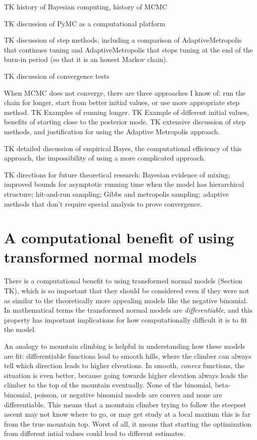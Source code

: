 TK history of Bayesian computing, history of MCMC

TK discussion of PyMC as a computational platform

TK discussion of step methods, including a comparison of
AdaptiveMetropolis that continues tuning and AdaptiveMetropolis that
stops tuning at the end of the burn-in period (so that it is an honest
Markov chain).

TK discussion of convergence tests

When MCMC does not converge, there are three approaches I know of: run
the chain for longer, start from better initial values, or use more
appropriate step method. TK Examples of running longer. TK Example of
different initial values, benefits of starting close to the posterior
mode. TK extensive discussion of step methods, and justification for
using the Adaptive Metropolis approach.

TK detailed discussion of empirical Bayes, the computational
efficiency of this approach, the impossibility of using a more
complicated approach.

TK directions for future theoretical research: Bayesian evidence of
mixing; improved bounds for asymptotic running time when the model has
hierarchical structure; hit-and-run sampling; Gibbs and metropolis
sampling; adaptive methods that don't require special analysis to
prove convergence.



\section{A computational benefit of using transformed normal models}

There is a computational benefit to using transformed normal models
(Section TK), which is so important that they should be considered
even if they were not as similar to the theoretically more appealing
models like the negative binomial.  In mathematical terms the
transformed normal models are \emph{differentiable}, and this property
has important implications for how computationally difficult it is to
fit the model.

An analogy to mountain climbing is helpful in understanding how these
models are fit: differentiable functions lead to smooth hills, where
the climber can always tell which direction leads to higher
elveations.  In smooth, \emph{convex} functions, the situation is even
better, because going towards higher elevation always leads the
climber to the top of the mountain eventually.  None of the binomial,
beta-binomial, poisson, or negative binomial models are convex and
none are differentiable.  This means that a mountain climber trying to
follow the steepest ascent may not know where to go, or may get study
at a local maxium this is far from the true mountain top.  Worst of
all, it means that starting the optimization from different intial
values could lead to different estimates.

